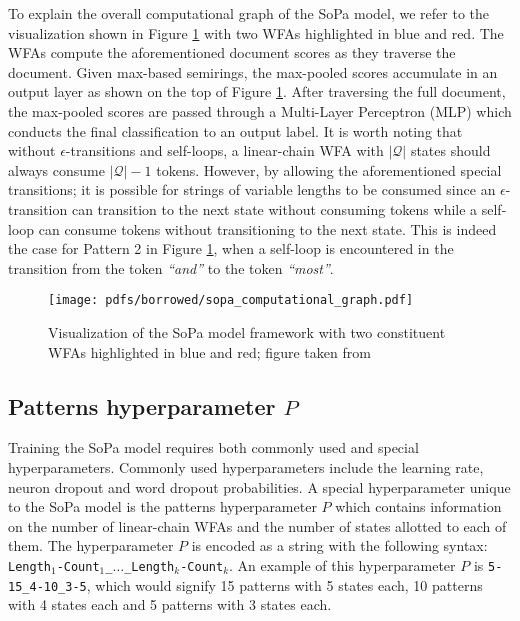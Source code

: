 \label{section:sopa_cg}

To explain the overall computational graph of the SoPa model, we refer to the
visualization shown in Figure \ref{fig:sopa} with two WFAs highlighted in blue and
red. The WFAs compute the aforementioned document scores as they traverse the document.
Given max-based semirings, the max-pooled scores accumulate in an output layer
as shown on the top of Figure \ref{fig:sopa}. After traversing the full
document, the max-pooled scores are passed through a Multi-Layer Perceptron
(MLP) which conducts the final classification to an output label. It is worth
noting that without $\epsilon$-transitions and self-loops, a linear-chain WFA
with $|\mathcal{Q}|$ states should always consume $\mathcal{|Q|}-1$ tokens.
However, by allowing the aforementioned special transitions; it is possible for
strings of variable lengths to be consumed since an $\epsilon$-transition can
transition to the next state without consuming tokens while a self-loop can
consume tokens without transitioning to the next state. This is indeed the case
for Pattern 2 in Figure \ref{fig:sopa}, when a self-loop is encountered in the
transition from the token \textit{``and''} to the token \textit{``most''}.

\begin{figure}[t]
  \centering
  \texttt{[image: pdfs/borrowed/sopa\_computational\_graph.pdf]}
  \caption{Visualization of the SoPa model framework with two constituent
    WFAs highlighted in blue and red; figure taken from
    \citet{schwartz2018sopa}}
  \label{fig:sopa}
\end{figure}

\subsection{Patterns hyperparameter $P$}

Training the SoPa model requires both commonly used and special hyperparameters.
Commonly used hyperparameters include the learning rate, neuron dropout and word
dropout probabilities. A special hyperparameter unique to the SoPa model is the
patterns hyperparameter $P$ which contains information on the number of
linear-chain WFAs and the number of states allotted to each of them. The
hyperparameter $P$ is encoded as a string with the following syntax:
\texttt{Length$_{1}$-Count$_{1}$\_$\dots$\_Length$_{k}$-Count$_{k}$}. An example
of this hyperparameter $P$ is \texttt{5-15\_4-10\_3-5}, which would signify 15
patterns with 5 states each, 10 patterns with 4 states each and 5 patterns with
3 states each.

